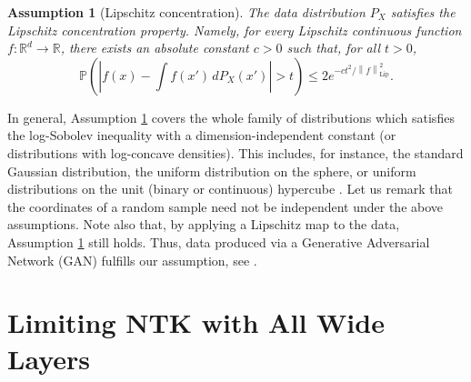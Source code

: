 \documentclass[11pt]{article}
\def\RR{\mathbb{R}}
\newtheorem{assumptions}[theorem]{Assumption}
\newcommand{\norm}[1]{\left\|#1\right\|}
\newcommand{\abs}[1]{\left|#1\right|}
\def\Lip{\mathrm{Lip}}
\def\PP{\mathbb{P}}
\begin{document}
\begin{assumptions}[Lipschitz concentration]\label{ass:data_dist2}
 The data distribution $P_X$ satisfies the \emph{Lipschitz concentration property}. Namely, for every Lipschitz continuous function $f:\RR^d\to\RR$, there exists an absolute constant $c>0$ such that, for all $t>0$,
$$
\PP\left(\abs{f(x)-\int f(x')\, dP_X(x')}>t\right)
\leq 2e^{-ct^2 / \norm{f}_{\Lip}^2}.
$$
\end{assumptions}
In general, Assumption \ref{ass:data_dist2} covers the whole family of distributions which satisfies the log-Sobolev inequality with a dimension-independent constant (or distributions with log-concave densities).
This includes, for instance, the standard Gaussian distribution, the uniform distribution on the sphere, 
or uniform distributions on the unit (binary or continuous) hypercube \citep{vershynin2018high}.
Let us remark that the coordinates of a random sample need not be independent under the above assumptions.
Note also that, by applying a Lipschitz map to the data, Assumption \ref{ass:data_dist2} still holds. 
Thus, data produced via a Generative Adversarial Network (GAN) fulfills our assumption, see \citep{seddik2020random}.




\section{Limiting NTK with All Wide Layers}\label{sec:NTK_infinite}
\end{document}
